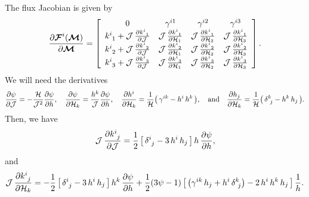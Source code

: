 \documentclass[10pt,preprint]{aastex}
\begin{document}
The flux Jacobian is given by
\begin{equation}
  \frac{\partial \boldsymbol{\mathcal{F}}^{i}(\boldsymbol{\mathcal{M}})}{\partial \boldsymbol{\mathcal{M}}}
  =\left[
  \begin{array}{cccc}
    0 & \gamma^{i1} & \gamma^{i2} & \gamma^{i3} \\
    k^{i}_{~1}+\mathcal{J}\,\frac{\partial k^{i}_{~1}}{\partial \mathcal{J}} & \mathcal{J}\,\frac{\partial k^{i}_{~1}}{\partial \mathcal{H}_{1}} & \mathcal{J}\,\frac{\partial k^{i}_{~1}}{\partial \mathcal{H}_{2}} & \mathcal{J}\,\frac{\partial k^{i}_{~1}}{\partial \mathcal{H}_{3}} \\
    k^{i}_{~2}+\mathcal{J}\,\frac{\partial k^{i}_{~2}}{\partial \mathcal{J}} & \mathcal{J}\,\frac{\partial k^{i}_{~2}}{\partial \mathcal{H}_{1}} & \mathcal{J}\,\frac{\partial k^{i}_{~2}}{\partial \mathcal{H}_{2}} & \mathcal{J}\,\frac{\partial k^{i}_{~2}}{\partial \mathcal{H}_{3}} \\
    k^{i}_{~3}+\mathcal{J}\,\frac{\partial k^{i}_{~3}}{\partial \mathcal{J}} & \mathcal{J}\,\frac{\partial k^{i}_{~3}}{\partial \mathcal{H}_{1}} & \mathcal{J}\,\frac{\partial k^{i}_{~3}}{\partial \mathcal{H}_{2}} & \mathcal{J}\,\frac{\partial k^{i}_{~3}}{\partial \mathcal{H}_{3}}
  \end{array}
  \right].  
\end{equation}
We will need the derivatives
\begin{equation}
  \frac{\partial \psi}{\partial \mathcal{J}}=-\frac{\mathcal{H}}{\mathcal{J}^{2}}\frac{\partial \psi}{\partial h},
  \quad
  \frac{\partial \psi}{\partial \mathcal{H}_{k}}=\frac{h^{k}}{\mathcal{J}}\frac{\partial \psi}{\partial h},
  \quad
  \frac{\partial h^{i}}{\partial \mathcal{H}_{k}}
  =\frac{1}{\mathcal{H}}\big(\,\gamma^{ik}-h^{i}\,h^{k}\,\big),
  \quad\text{and}\quad
  \frac{\partial h_{j}}{\partial \mathcal{H}_{k}}
  =\frac{1}{\mathcal{H}}\big(\,\delta^{k}_{~j}-h^{k}\,h_{j}\,\big).
\end{equation}
Then, we have
\begin{equation}
  \mathcal{J}\,\frac{\partial k^{i}_{~j}}{\partial \mathcal{J}}
  =\frac{1}{2}\,\big[\,\delta^{i}_{~j}-3\,h^{i}\,h_{j}\,\big]\,h\,\frac{\partial \psi}{\partial h},
\end{equation}
and
\begin{equation}
  \mathcal{J}\,\frac{\partial k^{i}_{~j}}{\partial \mathcal{H}_{k}}
  =-\frac{1}{2}\,\big[\,\delta^{i}_{~j}-3\,h^{i}\,h_{j}\,\big]\,h^{k}\,\frac{\partial \psi}{\partial h}
  +\frac{1}{2}(3\psi-1)\,\big[\,\big(\gamma^{ik}\,h_{j}+h^{i}\,\delta^{k}_{~j}\big)-2\,h^{i}\,h^{k}\,h_{j}\,\big]\,\frac{1}{h}.  
\end{equation}
\end{document}
